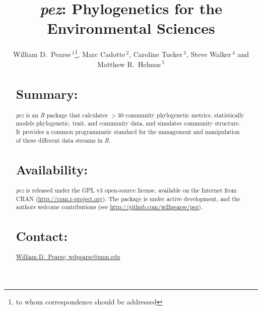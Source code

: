\documentclass{bioinfo}
\begin{document}

\title[\emph{pez}]{\emph{pez}: Phylogenetics for the Environmental
  Sciences} \author[Sample \textit{et~al}]{William D.\
  Pearse\,$^{1}$\footnote{to whom correspondence should be addressed},
  Marc Cadotte\,$^{2}$, Caroline Tucker\,$^{3}$, Steve Walker\,$^{4}$
  and Matthew R.\ Helmus\,$^5$} \address{$^{1}$Department of Ecology,
  Evolution, and Behavior, University of Minnesota, 100 Ecology
  Building, 1987 Upper Buford Circle, Saint Paul, Minnesota, 55108,
  USA, $^{2}$Department of Biological Sciences, University of
  Toronto–Scarborough, 1265 Military Trail, Scarborough, Ontario M1C
  1A4, Canada $^{3}$Department of Ecology and Evolutionary Biology,
  University of Colorado, Boulder, CO, USA, $^{4}$Ecology and
  Evolutionary Biology, University of Toronto, Toronto, Ontario M5S
  3G5, Canada, $^{5}$Department of Animal Ecology, Vrije Universiteit,
  1081 HV, Amsterdam, The Netherlands} \history{} \editor{}
\maketitle
\begin{abstract}
\section{Summary:}
\emph{pez} is an \emph{R} package that calculates $>$30 community
phylogenetic metrics, statistically models phylogenetic, trait, and
community data, and simulates community structure. It provides a
common programmatic standard for the management and manipulation of
these different data streams in \emph{R}.
\section{Availability:}
\emph{pez} is released under the GPL v3 open-source license, available
on the Internet from CRAN
(\href{http://cran.r-project.org}{http://cran.r-project.org}). The
package is under active development, and the authors welcome
contributions (see
\href{http://github.com/willpearse/pez}{http://github.com/willpearse/pez}).
\section{Contact:} \href{wdpearse@umn.edu}{William D.\ Pearse; wdpearse@umn.edu}
\end{abstract}
\end{document}
